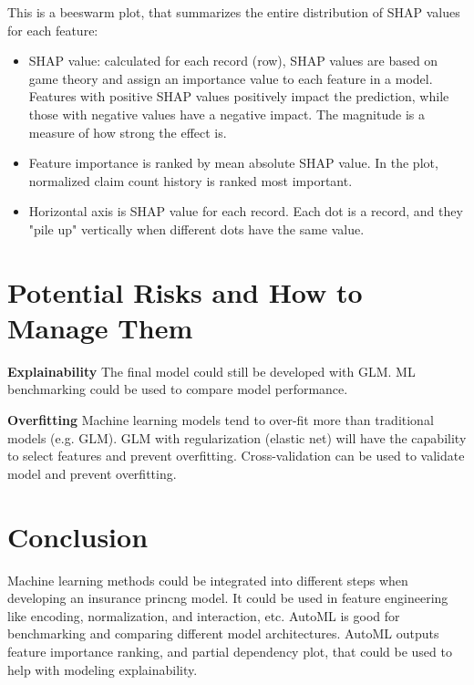 \documentclass{article}
\begin{document}
This is a beeswarm plot, that summarizes the entire distribution of SHAP values for each feature:
\begin{itemize}
    \item SHAP value: calculated for each record (row), SHAP values are based on game theory and assign an importance value to each feature in a model. Features with positive SHAP values positively impact the prediction, while those with negative values have a negative impact. The magnitude is a measure of how strong the effect is.
    \item Feature importance is ranked by mean absolute SHAP value. In the plot, normalized claim count history is ranked most important.
    \item Horizontal axis is SHAP value for each record. Each dot is a record, and they "pile up" vertically when different dots have the same value.
\end{itemize}


\section{Potential Risks and How to Manage Them}

\textbf{Explainability} The final model could still be developed with GLM. ML benchmarking could be used to compare model performance.

\textbf{Overfitting} Machine learning models tend to over-fit more than traditional models (e.g. GLM). GLM with regularization (elastic net) will have the capability to select features and prevent overfitting. Cross-validation can be used to validate model and prevent overfitting.


\section{Conclusion}

Machine learning methods could be integrated into different steps when developing an insurance princng model. It could be used in feature engineering like encoding, normalization, and interaction, etc. AutoML is good for benchmarking and comparing different model architectures. AutoML outputs feature importance ranking, and partial dependency plot, that could be used to help with modeling explainability.




\end{document}
